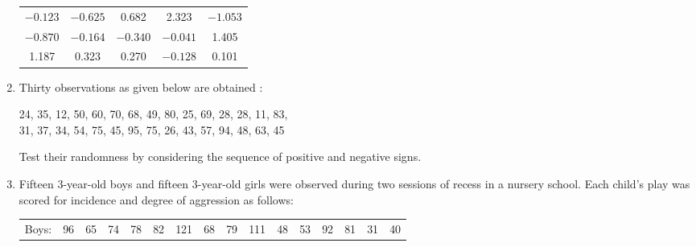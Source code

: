 \documentclass[11pt, a4paper]{article}
\begin{document}
\begin{enumerate}
\begin{table}[!htbp]
\begin{center}
\begin{tabular}{ccccc}
	$-0.123$ & $-0.625$ & 0.682 & 2.323 & $-1.053$ \\
	
	$-0.870$ & $-0.164$ & $-0.340$ & $-0.041$ & 1.405 \\
	
	1.187 & 0.323 & 0.270 & $-0.128$ & 0.101
	
	\end{tabular}
	\end{center}
	
	\end{table}
	
	
	
	
	
	
	
	
	
	



	\item Thirty observations as given below are obtained : 
	
	\begin{center}
	
	24, 35, 12, 50, 60, 70, 68, 49, 80, 25, 69, 28, 28, 11, 83, \\ 31, 37, 34, 54, 75, 45, 95, 75, 26, 43, 57, 94, 48, 63, 45 
	\end{center}
	
	Test their randomness by considering the sequence of positive and negative signs.
	
	
	
	
	
	
	
	
	
	
	
	
\newpage








	\item Fifteen 3-year-old boys and fifteen 3-year-old girls were observed during two sessions of recess in a nursery school. Each child’s play was scored for incidence and degree of aggression as follows:
	
	\begin{table}[!htbp]
	\def\arraystretch{1.5}
	
	\begin{center}
	\begin{tabular}{>{\centering}m{2cm}ccccccccccccccc}
	
	Boys: & 96 & 65 & 74 & 78 & 82 & 121 & 68 & 79 & 111 & 48 & 53 & 92 & 81 & 31 & 40 \\
	

\end{tabular}
\end{center}
\end{table}
\end{enumerate}
\end{document}
